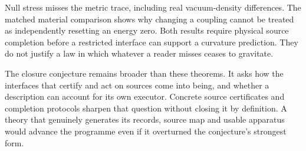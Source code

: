 \documentclass[12pt,a4paper]{article}
\theoremstyle{definition}
\begin{document}
Null stress misses the metric trace, including real vacuum-density
differences. The matched material comparison shows why changing a
coupling cannot be treated as independently resetting an energy zero.
Both results require physical source completion before a restricted
interface can support a curvature prediction. They do not justify a law
in which whatever a reader misses ceases to gravitate.

The closure conjecture remains broader than these theorems. It asks how
the interfaces that certify and act on sources come into being, and
whether a description can account for its own executor. Concrete source
certificates and completion protocols sharpen that question without
closing it by definition. A theory that genuinely generates its records,
source map and usable apparatus would advance the programme even if it
overturned the conjecture's strongest form.
\end{document}
